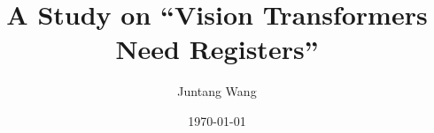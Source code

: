 \title%
[ViT-RGTS]%
{A Study on ``Vision Transformers Need Registers''}%

\author%
[Juntang Wang]%
{%
  Juntang Wang\footnotemark[1] 
}


\date%
[\today]%
{\today}
